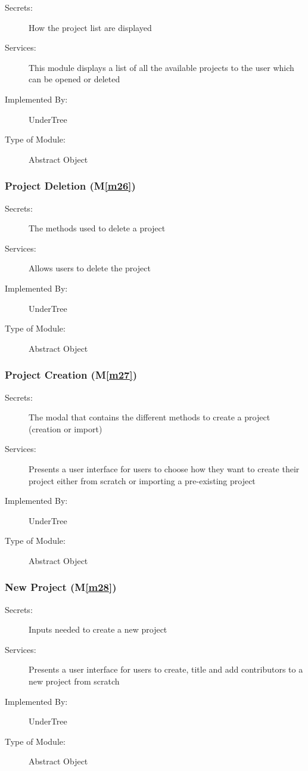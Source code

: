 \documentclass[12pt, titlepage]{article}
\newcommand{\mref}[1]{M\ref{#1}}
\begin{document}
	\begin{description}
		\item[Secrets:] How the project list are displayed
		\item[Services:] This module displays a list of all the available projects to the user which can be opened or deleted
		\item[Implemented By:] UnderTree
		\item[Type of Module:] Abstract Object
	\end{description}
	
	\subsubsection{Project Deletion (\mref{m26})}
	
	\begin{description}
		\item[Secrets:] The methods used to delete a project
		\item[Services:] Allows users to delete the project
		\item[Implemented By:] UnderTree
		\item[Type of Module:] Abstract Object
	\end{description}
	
	\subsubsection{Project Creation (\mref{m27})}
	
	\begin{description}
		\item[Secrets:] The modal that contains the different methods to create a project (creation or import)
		\item[Services:] Presents a user interface for users to choose how they want to create their project either from scratch or importing a pre-existing project
		\item[Implemented By:] UnderTree
		\item[Type of Module:] Abstract Object
	\end{description}
	
	\subsubsection{New Project (\mref{m28})}
	
	\begin{description}
		\item[Secrets:] Inputs needed to create a new project
		\item[Services:] Presents a user interface for users to create, title and add contributors to a new project from scratch
		\item[Implemented By:] UnderTree
		\item[Type of Module:] Abstract Object
	\end{description}
	
\end{document}
